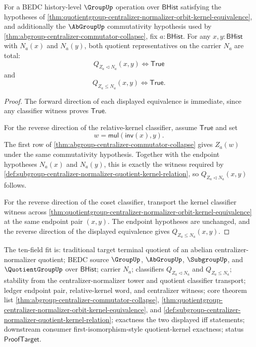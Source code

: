 \begin{theorem}
\label{thm:abelian-centralizer-normalizer-quotient-classifier-totality}
For a BEDC history-level $\GroupUp$ operation over $\mathsf{BHist}$ satisfying
the hypotheses of
\autoref{thm:quotientgroup-centralizer-normalizer-orbit-kernel-equivalence},
and additionally the $\AbGroupUp$ commutativity hypothesis used by
\autoref{thm:abgroup-centralizer-commutator-collapse}, fix
$a:\mathsf{BHist}$. For any $x,y:\mathsf{BHist}$ with $N_a(x)$ and $N_a(y)$,
both quotient representatives on the carrier $N_a$ are total:
$$
Q_{Z_a\triangleleft N_a}(x,y)\Longleftrightarrow \mathsf{True}
$$
and
$$
Q_{Z_a\leq N_a}(x,y)\Longleftrightarrow \mathsf{True}.
$$
\end{theorem}
\begin{proof}
The forward direction of each displayed equivalence is immediate, since any
classifier witness proves $\mathsf{True}$.

For the reverse direction of the relative-kernel classifier, assume
$\mathsf{True}$ and set
$$
w=\mathsf{mul}(\mathsf{inv}(x),y).
$$
The first row of
\autoref{thm:abgroup-centralizer-commutator-collapse} gives $Z_a(w)$ under the
same commutativity hypothesis. Together with the endpoint hypotheses $N_a(x)$
and $N_a(y)$, this is exactly the witness required by
\autoref{def:subgroup-centralizer-normalizer-quotient-kernel-relation}, so
$Q_{Z_a\triangleleft N_a}(x,y)$ follows.

For the reverse direction of the coset classifier, transport the kernel
classifier witness across
\autoref{thm:quotientgroup-centralizer-normalizer-orbit-kernel-equivalence}
at the same endpoint pair $(x,y)$. The endpoint hypotheses are unchanged, and
the reverse direction of the displayed equivalence gives
$Q_{Z_a\leq N_a}(x,y)$.
\end{proof}

The ten-field fit is: traditional target terminal quotient of an abelian
centralizer-normalizer quotient; BEDC source $\GroupUp$, $\AbGroupUp$,
$\SubgroupUp$, and $\QuotientGroupUp$ over $\mathsf{BHist}$; carrier $N_a$;
classifiers $Q_{Z_a\triangleleft N_a}$ and $Q_{Z_a\leq N_a}$; stability from
the centralizer-normalizer tower and quotient classifier transport; ledger
endpoint pair, relative-kernel word, and centralizer witness; core theorem list
\autoref{thm:abgroup-centralizer-commutator-collapse},
\autoref{thm:quotientgroup-centralizer-normalizer-orbit-kernel-equivalence},
and \autoref{def:subgroup-centralizer-normalizer-quotient-kernel-relation};
exactness the two displayed iff statements; downstream consumer
first-isomorphism-style quotient-kernel exactness; status
$\mathsf{ProofTarget}$.

